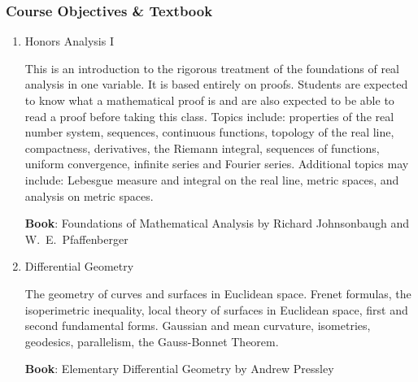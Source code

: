 \documentclass[11pt]{article}
\begin{document}
\subsubsection*{Course Objectives \& Textbook}
\begin{enumerate}
    \item Honors Analysis I
    
    This is an introduction to the rigorous treatment of the foundations of real analysis in one variable. It is based entirely on proofs. Students are expected to know what a mathematical proof is and are also expected to be able to read a proof before taking this class. Topics include: properties of the real number system, sequences, continuous functions, topology of the real line, compactness, derivatives, the Riemann integral, sequences of functions, uniform convergence, infinite series and Fourier series. Additional topics may include: Lebesgue measure and integral on the real line, metric spaces, and analysis on metric spaces.
    
    \textbf{Book}: Foundations of Mathematical Analysis by Richard Johnsonbaugh and W.\ E.\ Pfaffenberger

    \item Differential Geometry
    
    The geometry of curves and surfaces in Euclidean space. Frenet formulas, the isoperimetric inequality, local theory of surfaces in Euclidean space, first and second fundamental forms. Gaussian and mean curvature, isometries, geodesics, parallelism, the Gauss-Bonnet Theorem.
    
    \textbf{Book}: Elementary Differential Geometry by Andrew Pressley
\end{enumerate}
\end{document}
